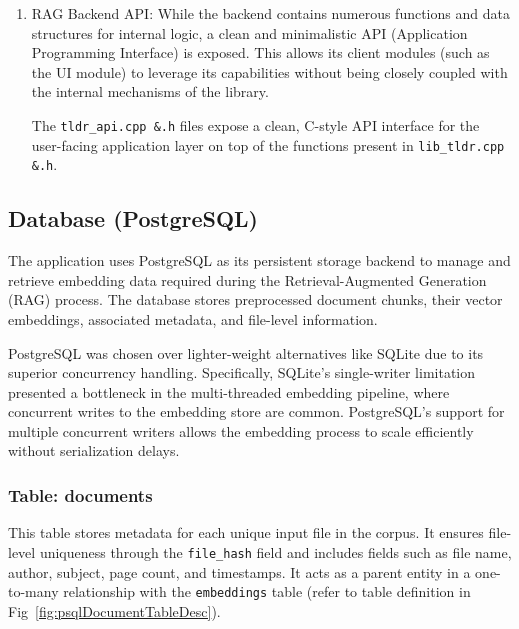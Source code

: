\begin{enumerate}[label=\Alph*.]
\item{RAG Backend API:}
While the backend contains numerous functions and data structures for internal logic, a clean and minimalistic API (Application Programming Interface) is exposed. This allows its client modules (such as the UI module) to leverage its capabilities without being closely coupled with the internal mechanisms of the library.

The \texttt{tldr\_api.cpp \&.h} files expose a clean, C-style API interface for the user-facing application layer on top of the functions present in \texttt{lib\_tldr.cpp \&.h}. 

\end{enumerate}

\subsection{Database (PostgreSQL)}
\label{subsec:AppDesignModules-DatabasePSQL}
The application uses PostgreSQL as its persistent storage backend to manage and retrieve embedding data required during the Retrieval-Augmented Generation (RAG) process. The database stores preprocessed document chunks, their vector embeddings, associated metadata, and file-level information.

PostgreSQL was chosen over lighter-weight alternatives like SQLite due to its superior concurrency handling. Specifically, SQLite’s single-writer limitation presented a bottleneck in the multi-threaded embedding pipeline, where concurrent writes to the embedding store are common. PostgreSQL’s support for multiple concurrent writers allows the embedding process to scale efficiently without serialization delays.

\subsubsection{Table: documents}
This table stores metadata for each unique input file in the corpus. It ensures file-level uniqueness through the \texttt{file\_hash} field and includes fields such as file name, author, subject, page count, and timestamps. It acts as a parent entity in a one-to-many relationship with the \texttt{embeddings} table (refer to table definition in Fig~\ref{fig:psqlDocumentTableDesc}). 

